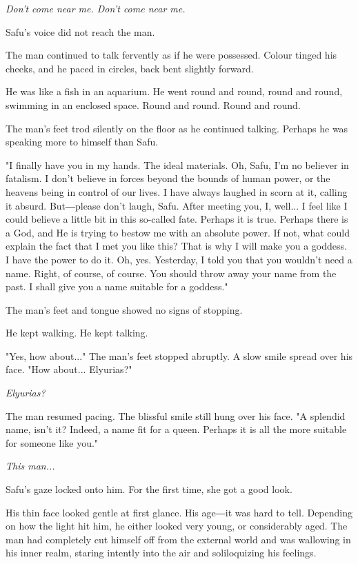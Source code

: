 \emph{Don't come near me. Don't come near me.}

Safu's voice did not reach the man.

The man continued to talk fervently as if he were possessed. Colour
tinged his cheeks, and he paced in circles, back bent slightly forward.

He was like a fish in an aquarium. He went round and round, round and
round, swimming in an enclosed space. Round and round. Round and round.

The man's feet trod silently on the floor as he continued talking.
Perhaps he was speaking more to himself than Safu.

"I finally have you in my hands. The ideal materials. Oh, Safu, I'm no
believer in fatalism. I don't believe in forces beyond the bounds of
human power, or the heavens being in control of our lives. I have always
laughed in scorn at it, calling it absurd. But―please don't laugh, Safu.
After meeting you, I, well... I feel like I could believe a little bit
in this so-called fate. Perhaps it is true. Perhaps there is a God, and
He is trying to bestow me with an absolute power. If not, what could
explain the fact that I met you like this? That is why I will make you a
goddess. I have the power to do it. Oh, yes. Yesterday, I told you that
you wouldn't need a name. Right, of course, of course. You should throw
away your name from the past. I shall give you a name suitable for a
goddess."

The man's feet and tongue showed no signs of stopping.

He kept walking. He kept talking.

"Yes, how about..." The man's feet stopped abruptly. A slow smile spread
over his face. "How about... Elyurias?"

\emph{Elyurias?}

The man resumed pacing. The blissful smile still hung over his face. "A
splendid name, isn't it? Indeed, a name fit for a queen. Perhaps it is
all the more suitable for someone like you."

\emph{This man...}

Safu's gaze locked onto him. For the first time, she got a good look.

His thin face looked gentle at first glance. His age―it was hard to
tell. Depending on how the light hit him, he either looked very young,
or considerably aged. The man had completely cut himself off from the
external world and was wallowing in his inner realm, staring intently
into the air and soliloquizing his feelings.

